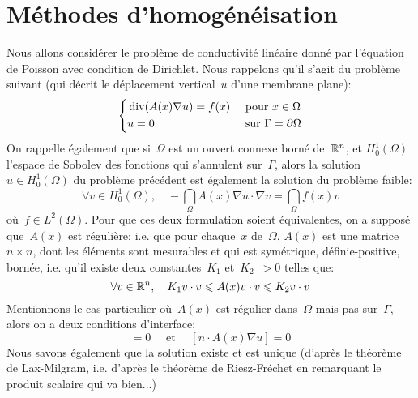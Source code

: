 \medskip
\section{Méthodes d'homogénéisation}

Nous allons considérer le problème de conductivité linéaire donné par l'équation de Poisson avec condition de Dirichlet. Nous rappelons qu'il s'agit du problème suivant (qui décrit le déplacement vertical~$u$ d'une membrane plane):
\begin{equation}
\left\{
\begin{aligned}
&\operatorname{div}(A(x)\nabla u) = f(x)&&\text{ pour } x\in\Omega\\
&u=0 &&\text{ sur } \Gamma=\partial\Omega
\end{aligned}
\right.
\end{equation}
On rappelle également que si~$\Omega$ est un ouvert connexe borné de~$\mathbb R^n$, et $H_0^1(\Omega)$ l'espace de Sobolev des fonctions qui s'annulent sur~$\Gamma$, alors la solution $u\in H_0^1(\Omega)$ du problème précédent est également la solution du problème faible:
\begin{equation}
\forall v\in H_0^1(\Omega),\quad -\dint_\Omega A(x)\nabla u\cdot\nabla v = \dint_\Omega f(x)v
\end{equation}
où~$f\in L^2(\Omega)$.
Pour que ces deux formulation soient équivalentes, on a supposé que~$A(x)$ est régulière: i.e. que pour chaque~$x$ de~$\Omega$, $A(x)$ est une matrice~$n\times n$, dont les éléments sont mesurables et qui est symétrique, définie-positive, bornée, i.e. qu'il existe deux constantes~$K_1$ et~$K_2$~$>0$ telles que:
\begin{equation}\forall v\in\mathbb R^n,\quad K_1 v\cdot v \leqslant A(x) v\cdot v \leqslant K_2 v\cdot v\end{equation}
Mentionnons le cas particulier où~$A(x)$ est régulier dans~$\Omega$ mais pas sur~$\Gamma$, alors on a deux conditions d'interface:
\begin{equation}
[u]=0 \quad\text{ et }\quad [n\cdot A(x)\nabla u]=0
\end{equation}
Nous savons également que la solution existe et est unique (d'après le théorème de Lax-Milgram, i.e. d'après le théorème de Riesz-Fréchet en remarquant le produit scalaire qui va bien...)

